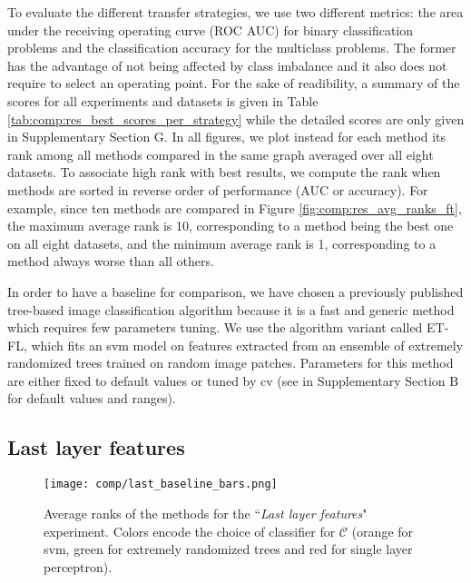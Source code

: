 To evaluate the different transfer strategies, we use two different metrics: the area under the receiving operating curve (ROC AUC) for binary classification problems and the classification accuracy for the multiclass problems. The former has the advantage of not being affected by class imbalance and it also does not require to select an operating point. For the sake of readibility, a summary of the scores for all experiments and datasets is given in Table \ref{tab:comp:res_best_scores_per_strategy} while the detailed scores are only given in Supplementary Section G. In all figures, we plot instead for each method its rank among all methods compared in the same graph averaged over all eight datasets. To associate high rank with best results, we compute the rank when methods are sorted in reverse order of performance (AUC or accuracy). For example, since ten methods are compared in Figure \ref{fig:comp:res_avg_ranks_ft}, the maximum average rank is 10, corresponding to a method being the best one on all eight datasets, and the minimum average rank is 1, corresponding to a method always worse than all others.

In order to have a baseline for comparison, we have chosen a previously published tree-based image classification algorithm \parencite{maree2016towards} because it is a fast and generic method which requires few parameters tuning. We use the algorithm variant called ET-FL, which fits an \acrshort{svm} model on features extracted from an ensemble of extremely randomized trees trained on random image patches. Parameters for this method are either fixed to default values or tuned by \acrlong{cv} (see in Supplementary Section B for default values and ranges).



 
  
  
\subsection{Last layer features}
\label{ssec:comp:exp_last_layer}


 \begin{figure}
     \center
     \texttt{[image: comp/last\_baseline\_bars.png]}
     \caption{Average ranks of the methods for the ``\textit{Last layer features}" experiment. Colors encode the choice of classifier for $\mathcal{C}$ (orange for \acrshort{svm}, green for extremely randomized trees and red for single layer perceptron).}
     \label{fig:comp:avg_ranks_last_layer}
 \end{figure}


